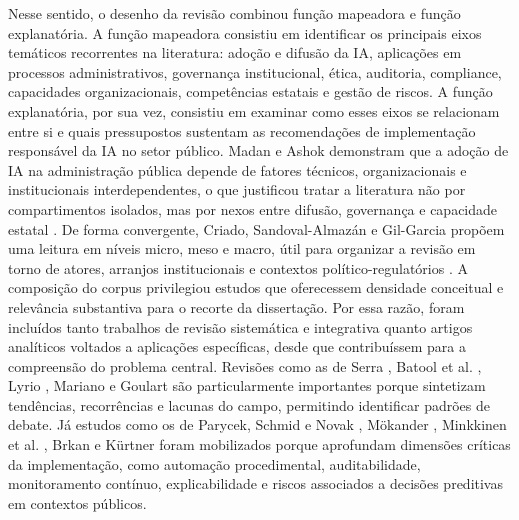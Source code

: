 \documentclass[12pt,a4paper]{article}
\begin{document}
Nesse sentido, o desenho da revisão combinou função mapeadora e função explanatória. A função mapeadora consistiu em identificar os principais eixos temáticos recorrentes na literatura: adoção e difusão da IA, aplicações em processos administrativos, governança institucional, ética, auditoria, compliance, capacidades organizacionais, competências estatais e gestão de riscos. A função explanatória, por sua vez, consistiu em examinar como esses eixos se relacionam entre si e quais pressupostos sustentam as recomendações de implementação responsável da IA no setor público. Madan e Ashok demonstram que a adoção de IA na administração pública depende de fatores técnicos, organizacionais e institucionais interdependentes, o que justificou tratar a literatura não por compartimentos isolados, mas por nexos entre difusão, governança e capacidade estatal \autocite{madan2022ai}. De forma convergente, Criado, Sandoval-Almazán e Gil-Garcia propõem uma leitura em níveis micro, meso e macro, útil para organizar a revisão em torno de atores, arranjos institucionais e contextos político-regulatórios \autocite{criado2024artificial}.
A composição do corpus privilegiou estudos que oferecessem densidade conceitual e relevância substantiva para o recorte da dissertação. Por essa razão, foram incluídos tanto trabalhos de revisão sistemática e integrativa quanto artigos analíticos voltados a aplicações específicas, desde que contribuíssem para a compreensão do problema central. Revisões como as de Serra \autocite{serra2024a}, Batool et al. \autocite{batool2025ai}, Lyrio \autocite{lyrio2025emerging}, Mariano \autocite{mariano2026inteligencia} e Goulart \autocite{goulart2025processos} são particularmente importantes porque sintetizam tendências, recorrências e lacunas do campo, permitindo identificar padrões de debate. Já estudos como os de Parycek, Schmid e Novak \autocite{parycek2023artificial}, Mökander \autocite{mkander2023auditing}, Minkkinen et al. \autocite{minkkinen2022continuous}, Brkan \autocite{brkan2020legal} e Kürtner \autocite{krtner2021predictive} foram mobilizados porque aprofundam dimensões críticas da implementação, como automação procedimental, auditabilidade, monitoramento contínuo, explicabilidade e riscos associados a decisões preditivas em contextos públicos.
\end{document}
